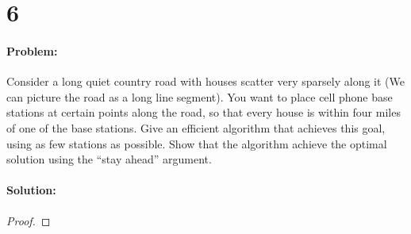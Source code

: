 \documentclass[12pt]{article}
\begin{document}
\section*{6}
\paragraph{Problem:}
Consider a long quiet country road with houses scatter very sparsely along
it (We can picture the road as a long line segment). You want to place cell
phone base stations at certain points along the road, so that every house
is within four miles of one of the base stations.
Give an efficient algorithm that achieves this goal, using as few stations
as possible. Show that the algorithm achieve the optimal solution using
the “stay ahead” argument.
\paragraph{Solution:}
\begin{proof}

\end{proof}
\end{document}
